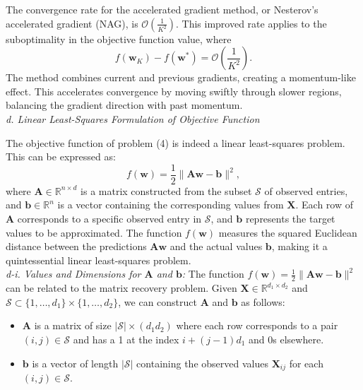 \documentclass[12pt]{article}
\begin{document}
    The convergence rate for the accelerated gradient method, or Nesterov's accelerated gradient (NAG), is \(\mathcal{O}\left(\frac{1}{K^2}\right)\). This improved rate applies to the suboptimality in the objective function value, where
    \[
        f(\boldsymbol{w}_K) - f(\boldsymbol{w}^*) = \mathcal{O}\left(\frac{1}{K^2}\right).
    \]
    The method combines current and previous gradients, creating a momentum-like effect. This accelerates convergence by moving swiftly through slower regions, balancing the gradient direction with past momentum.\\

    \textit{d. Linear Least-Squares Formulation of Objective Function}

    The objective function of problem (4) is indeed a linear least-squares problem. This can be expressed as:
    \[
        f(\boldsymbol{w}) = \frac{1}{2} \|\boldsymbol{A} \boldsymbol{w} - \boldsymbol{b}\|^{2},
    \]
    where \(\boldsymbol{A} \in \mathbb{R}^{n \times d}\) is a matrix constructed from the subset \(\mathcal{S}\) of observed entries, and \(\boldsymbol{b} \in \mathbb{R}^{n}\) is a vector containing the corresponding values from \(\boldsymbol{X}\). Each row of \(\boldsymbol{A}\) corresponds to a specific observed entry in \(\mathcal{S}\), and \(\boldsymbol{b}\) represents the target values to be approximated. The function \(f(\boldsymbol{w})\) measures the squared Euclidean distance between the predictions \(\boldsymbol{A} \boldsymbol{w}\) and the actual values \(\boldsymbol{b}\), making it a quintessential linear least-squares problem.\\

    \textit{d-i. Values and Dimensions for \(\boldsymbol{A}\) and \(\boldsymbol{b}\):}
    The function \(f(\boldsymbol{w})=\frac{1}{2}\|\boldsymbol{A} \boldsymbol{w}-\boldsymbol{b}\|^{2}\) can be related to the matrix recovery problem. Given \(\boldsymbol{X} \in \mathbb{R}^{d_1 \times d_2}\) and \(\mathcal{S} \subset\{1, \ldots, d_1\} \times\{1, \ldots, d_2\}\), we can construct \(\boldsymbol{A}\) and \(\boldsymbol{b}\) as follows:
    \begin{itemize}
        \item \(\boldsymbol{A}\) is a matrix of size \(|\mathcal{S}| \times (d_1 d_2)\) where each row corresponds to a pair \((i, j) \in \mathcal{S}\) and has a 1 at the index \(i + (j-1)d_1\) and 0s elsewhere.
        \item \(\boldsymbol{b}\) is a vector of length \(|\mathcal{S}|\) containing the observed values \(\boldsymbol{X}_{ij}\) for each \((i, j) \in \mathcal{S}\).
    \end{itemize}
\end{document}
